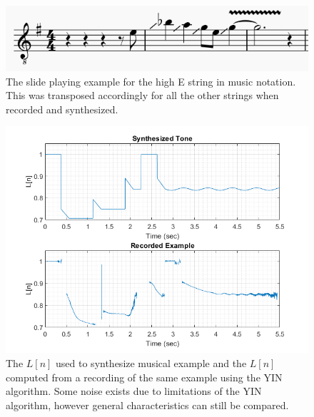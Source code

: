 \documentclass[../main.tex]{subfiles}
\begin{document}
\begin{figure}[h]
    \centering
    \includegraphics[scale=.75]{./images/pictures/slideLick.png}
    \caption{The slide playing example for the high E string in music notation. This was transposed accordingly for all the other strings when recorded and synthesized.}
    \label{fig:slideLick}
\end{figure}

\begin{figure}[h]
    \centering
    \includegraphics[scale=.65]{./images/plots/L_nComparison.png}
    \caption{The $L[n]$ used to synthesize musical example and the $L[n]$ computed from a recording of the same example using the YIN algorithm. Some noise exists due to limitations of the YIN algorithm, however general characteristics can still be compared.}
    \label{fig:LnCompare}
\end{figure}
\end{document}
